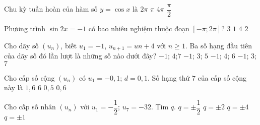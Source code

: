 \begin{ex}%
	Chu kỳ tuần hoàn của hàm số $y=\cos x$ là
	\choice
	{\True $2\pi$}
	{$\pi$}
	{$4\pi$}
	{$\dfrac{\pi}{2}$}
\end{ex}
\begin{ex}%
	Phương trình $\sin 2x=-1$ có bao nhiêu nghiệm thuộc đoạn $[-\pi;2\pi]$?
	\choice
	{\True $3$}
	{$1$}
	{$4$}
	{$2$}
\end{ex}
\begin{ex}%
	Cho dãy số $(u_n)$, biết $u_1=-1$, $u_{n+1}=un+4$ với $n\ge 1$. Ba số hạng đầu tiên của dãy số đó lần lượt là những số nào dưới đây?
	\choice
	{$-1$; $4$;$ 7$}
	{$-1$; $3$; $5$}
	{$-1$; $4$; $6$}
	{\True $-1$; $3$; $7$}
\end{ex}
\begin{ex}%
	Cho cấp số cộng $(u_n)$ có $u_1=-0{,}1$; $d=0{,}1$. Số hạng thứ $7$ của cấp số cộng này là
	\choice
	{$1{,}6$}
	{$6$}
	{$0{,}5$}
	{\True $0{,}6$}
\end{ex}
\begin{ex}%
	Cho cấp số nhân $(u_n)$ với $u_1=-\dfrac{1}{2}$; $u_7=-32$. Tìm $q$.
	\choice
	{$q=\pm\dfrac{1}{2}$}
	{\True $q=\pm 2$}
	{$q=\pm 4$}
	{$q=\pm 1$}
\end{ex}
